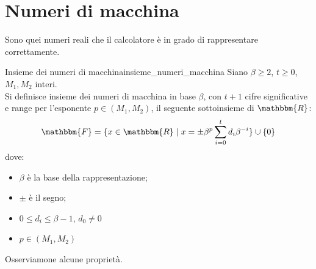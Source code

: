 \documentclass[12pt]{report}
\newcounter{definition}
\newcommand{\nmu}{}
\begin{document}
\section{Numeri di macchina}
Sono quei numeri reali che il calcolatore è in grado di rappresentare correttamente.
\begin{definition}{\nmu Insieme dei numeri di macchina}{insieme_numeri_macchina}
	Siano $\beta \geq 2$, $t \geq 0$, $M_1, M_2$ interi. \\
	Si definisce insieme dei numeri di macchina in base $\beta$, con $t + 1$ cifre significative e range per l'esponente $p \in (M_1, M_2)$, il seguente sottoinsieme di $\mathbbm{R}$:
	\[
	\mathbbm{F} = \{ x \in \mathbbm{R} \mid x = \pm \beta^p\sum_{i=0}^{t}d_i\beta^{-i}\} \cup \{0\}
	\]
	dove:
	\begin{itemize}
		\item $\beta$ è la base della rappresentazione;
		\item $\pm$ è il segno;
		\item $ 0 \leq d_i \leq \beta -1$, $d_0 \neq 0$
		\item $p \in  (M_1, M_2)$
	\end{itemize}
\end{definition}
Osserviamone alcune proprietà.
\end{document}
